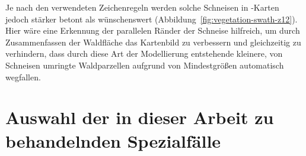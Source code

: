 \documentclass[../main/thesis.tex]{subfiles}
\begin{document}

Je nach den verwendeten Zeichenregeln werden solche Schneisen in \osm-Karten jedoch stärker betont als wünschenswert (Abbildung~\ref{fig:vegetation-swath-z12}).
Hier wäre eine Erkennung der parallelen Ränder der Schneise hilfreich, um durch Zusammenfassen der Waldfläche das Kartenbild zu verbessern und gleichzeitig zu verhindern, dass durch diese Art der Modellierung entstehende kleinere, von Schneisen umringte Waldparzellen aufgrund von Mindestgrößen automatisch wegfallen.



%





\section{Auswahl der in dieser Arbeit zu behandelnden Spezialfälle}
\label{ch:case-selection}
\end{document}
